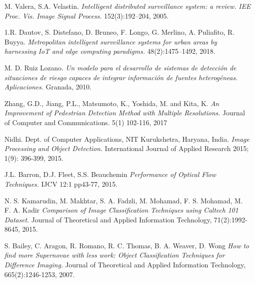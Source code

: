 \documentclass[a4paper,12pt,twoside]{article}
\begin{document}
	
\newpage	
\begin{thebibliography}{9}
	M. Valera, S.A. Velastin. \textit{Intelligent distributed surveillance system: a review. IEE Proc. Vis. Image Signal Process.} 152(3):192–204, 2005.
	
	1.R. Dautov, S. Distefano, D. Bruneo, F. Longo, G. Merlino, A. Puliafito, R. Buyya. \textit{Metropolitan intelligent surveillance systems for urban areas by harnessing IoT and edge computing paradigms.} 48(2):1475–1492, 2018.

	M. D. Ruiz Lozano. \textit{Un modelo para el desarrollo de sistemas de detección de situaciones de riesgo capaces de integrar información de fuentes heterogéneas. Aplicaciones.} Granada, 2010.

	Zhang, G.D., Jiang, P.L., Matsumoto, K., Yoshida, M. and Kita, K. \textit{An Improvement of Pedestrian Detection Method with Multiple Resolutions.} Journal of Computer and Communications. 5(1) 102-116, 2017

	Nidhi. Dept. of Computer Applications, NIT Kurukshetra, Haryana, India. \textit{Image Processing and Object Detection.} International Journal of Applied Research 2015; 1(9): 396-399, 2015.
	
	J.L. Barron, D.J. Fleet, S.S. Beauchemin \textit{Performance of Optical Flow Techniques.} IJCV 12:1 pp43-77, 2015.
	
	N. S. Kamarudin, M. Makhtar, S. A. Fadzli, M. Mohamad, F. S. Mohamad, M. F. A. 
	Kadir \textit{Comparison of Image Classification Techniques using Caltech 101 Dataset.} Journal of Theoretical and Applied Information Technology, 71(2):1992-8645, 2015.
	
	S. Bailey, C. Aragon, R. Romano, R. C. Thomas, B. A. Weaver, D. Wong \textit{How to find more Supernovae with less work: Object Classification Techniques for Difference Imaging.} Journal of Theoretical and Applied Information Technology, 665(2):1246-1253, 2007.	
	
	
	
\end{thebibliography}
\end{document}
